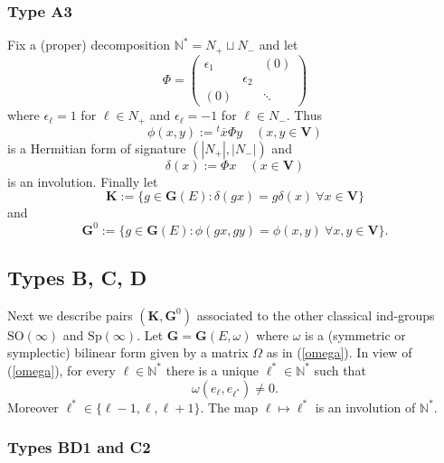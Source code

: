 \documentclass{amsart}
\theoremstyle{definition}
\newcommand{\NN}{\mathbb{N}^*}
\begin{document}
\subsubsection{Type A3}
\label{S:A3}
Fix a (proper) decomposition $\NN=N_+\sqcup N_-$ and let
\begin{equation}
\label{phi}
\Phi=\left(
\begin{array}{cccc}
\epsilon_1 & & (0) \\
 & \epsilon_2 \\
(0) & & \ddots
\end{array}
\right)
\end{equation}
where $\epsilon_\ell=1$ for $\ell\in N_+$ and $\epsilon_\ell=-1$ for $\ell\in N_-$.
Thus
\[\phi(x,y):={}^t\overline{x} \Phi y\quad(x,y\in\mathbf{V})\]
is a Hermitian form of signature $(|N_+|,|N_-|)$ and
\[\delta(x):=\Phi x\quad(x\in\mathbf{V})\]
is an involution. Finally let
\[
\mathbf{K}:=\{g\in \mathbf{G}(E):\delta(gx)=g\delta(x)\ \forall
x\in\mathbf{V}\}
\]
and
\[
\mathbf{G}^0:=\{g\in \mathbf{G}(E):\phi(gx,gy)=\phi(x,y)\ \forall
 x,y\in\mathbf{V}\}.
\]




\subsection*{Types B, C, D}
Next we describe pairs $(\mathbf{K},\mathbf{G}^0)$ associated to
the other classical ind-groups $\mathrm{SO}(\infty)$ and $\mathrm{Sp}(\infty)$.  Let $\mathbf{G}=\mathbf{G}(E,\omega)$
where $\omega$ is a (symmetric or symplectic) bilinear form given by a matrix $\Omega$ as in (\ref{omega}).
In view of (\ref{omega}), for every $\ell\in\NN$ there is a unique $\ell^*\in\NN$ such that
\[\omega(e_\ell,e_{\ell^*})\not=0.\]
Moreover $\ell^*\in\{\ell-1,\ell,\ell+1\}$. The map $\ell\mapsto\ell^*$ is an involution of $\NN$.


\subsubsection{Types BD1 and C2}
\label{S:BD1C2}
\end{document}
